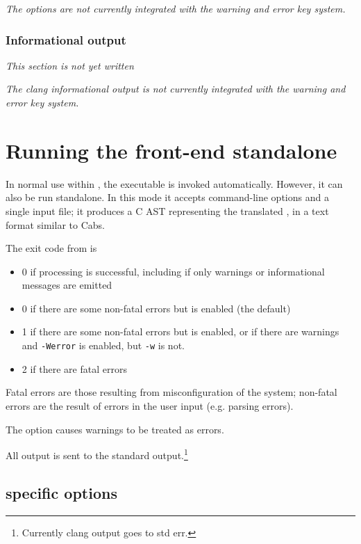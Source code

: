 \textit{The \clang options are not currently integrated with the \fc warning and error key system.}

\subsection{Informational output}

\textit{This section is not yet written}

\textit{The clang informational output is not currently integrated with the \fc warning and error key system.}

\chapter{Running the \fclang front-end standalone}
\label{sec:standalone}

In normal use within \framac, the \irg executable is
invoked automatically. However, it can also be run standalone.
In this mode it accepts command-line options and a single input file;
it produces a C AST representing the translated \cpp, in a text format similar to Cabs.

The exit code from \irg is
\begin{itemize}
\item 0 if processing is successful, including if only warnings or informational messages are emitted
\item 0 if there are some non-fatal errors but  is enabled (the default)
\item 1 if there are some non-fatal errors but  is enabled, or if there are warnings and \lstinline|-Werror| is enabled, but \lstinline|-w| is not.
\item 2 if there are fatal errors
\end{itemize}
Fatal errors are those resulting from misconfiguration of the system; non-fatal errors are the result of errors in the user input (e.g. parsing errors).

The  option causes warnings to be treated as errors. 

All output is sent to the standard output.\footnote{Currently clang output goes to std err.}

\section{\irg specific options}
\label{sec:fcloptions}

